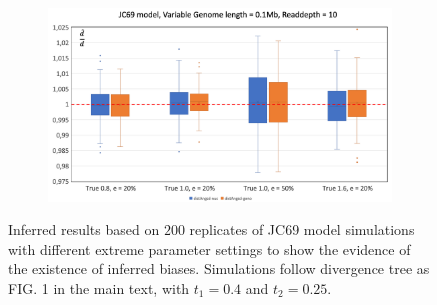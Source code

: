 \documentclass{article}
\begin{document}
\begin{figure}
\begin{subfigure}{.5\textwidth}
  \caption{}
  \label{fig:BiasJCRD10_1M}
\end{subfigure}
\begin{subfigure}{.5\textwidth}
  \centering
  \includegraphics[width=.99\linewidth]{BiasJCRD10_01M.png}  
  \caption{}
  \label{fig:BiasJCRD10_01M}
\end{subfigure}
\caption{Inferred results based on $200$ replicates of JC69 model simulations with different extreme parameter settings to show the evidence of the existence of inferred biases. Simulations follow divergence tree as FIG. 1 in the main text, with $t_1=0.4$ and $t_2 = 0.25$.}
\label{fig:BiasJC}
\end{figure}
\end{document}
